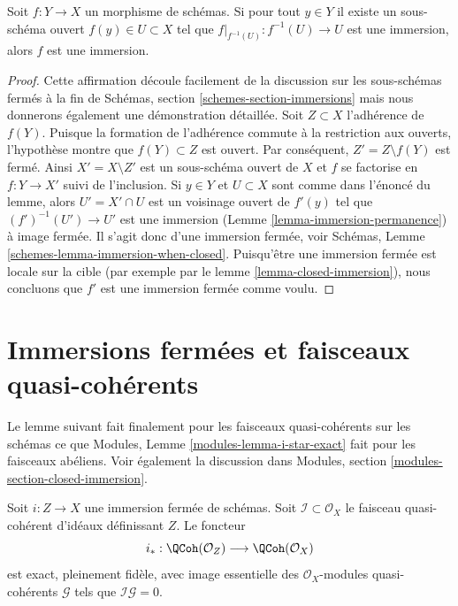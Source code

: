 \begin{lemma}
\label{lemma-check-immersion}
Soit $f : Y \to X$ un morphisme de schémas. Si pour tout $y \in Y$
il existe un sous-schéma ouvert $f(y) \in U \subset X$ tel que
$f|_{f^{-1}(U)} : f^{-1}(U) \to U$ est une immersion, alors $f$ est une
immersion.
\end{lemma}

\begin{proof}
Cette affirmation découle facilement de la discussion sur les sous-schémas
fermés à la fin de Schémas, section \ref{schemes-section-immersions} mais nous
donnerons également une démonstration
détaillée. Soit $Z \subset X$ l'adhérence de $f(Y)$. Puisque la formation
de l'adhérence commute à la restriction aux ouverts, l'hypothèse montre que
$f(Y) \subset Z$ est ouvert. Par conséquent,
$Z' = Z \setminus f(Y)$ est fermé. Ainsi $X' = X \setminus Z'$ est un sous-schéma
ouvert de $X$ et $f$ se factorise en
$f : Y \to X'$ suivi de l'inclusion. Si $y \in Y$ et $U \subset X$
sont comme dans l'énoncé du lemme, alors $U' = X' \cap U$
est un voisinage ouvert de $f'(y)$ tel que $(f')^{-1}(U') \to U'$
est une immersion (Lemme \ref{lemma-immersion-permanence}) à image fermée.
Il s'agit donc d'une immersion fermée,
voir Schémas, Lemme \ref{schemes-lemma-immersion-when-closed}. Puisqu'être une
immersion fermée est locale sur la cible (par exemple
par le lemme \ref{lemma-closed-immersion}), nous concluons que
$f'$ est une immersion fermée comme voulu.
\end{proof}








\section{Immersions fermées et faisceaux quasi-cohérents}
\label{section-closed-immersions-quasi-coherent}

\noindent
Le lemme suivant fait finalement pour les faisceaux quasi-cohérents
sur les schémas ce que Modules, Lemme \ref{modules-lemma-i-star-exact} fait pour les faisceaux
abéliens. Voir également
la discussion dans Modules, section \ref{modules-section-closed-immersion}.

\begin{lemma}
\label{lemma-i-star-equivalence}
Soit $i : Z \to X$ une immersion fermée de schémas.
Soit $\mathcal{I} \subset \mathcal{O}_X$ le faisceau quasi-cohérent d'idéaux définissant
$Z$. Le foncteur
$$
i_* :
\QCoh(\mathcal{O}_Z)
\longrightarrow
\QCoh(\mathcal{O}_X)
$$
est exact, pleinement fidèle, avec image essentielle des $\mathcal{O}_X$-modules
quasi-cohérents $\mathcal{G}$ tels que $\mathcal{I}\mathcal{G} = 0$.
\end{lemma}

